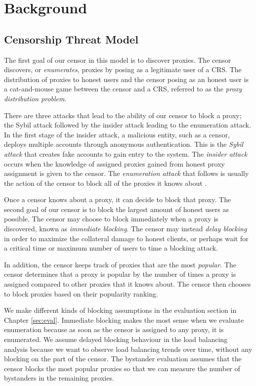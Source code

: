\chapter{Background}
\label{sec:background}
\newtheorem{theorem}{Theorem}

\section{Censorship Threat Model} 

The first goal of our censor in this model is to discover proxies. The censor discovers, or \textit{enumerates}, proxies by posing as a legitimate user of a \ac{CRS}. The distribution of proxies to honest users and the censor posing as an honest user is a cat-and-mouse game between the censor and a \ac{CRS}, referred to as the \textit{proxy distribution problem}. 

There are three attacks that lead to the ability of our censor to block a proxy; the Sybil attack followed by the insider attack leading to the enumeration attack. In the first stage of the insider attack, a malicious entity, such as a censor, deploys multiple accounts through anonymous authentication. This is the \textit{Sybil attack} that creates fake accounts to gain entry to the system. The \textit{insider attack} occurs when the knowledge of assigned proxies gained from honest proxy assignment is given to the censor. The \textit{enumeration attack} that follows is usually the action of the censor to block all of the proxies it knows about \cite{wang2013rbridge}.

Once a censor knows about a proxy, it can decide to block that proxy. The second goal of our censor is to block the largest amount of honest users as possible. The censor may choose to block immediately when a proxy is discovered, known as \textit{immediate blocking}. The censor may instead \textit{delay blocking} in order to maximize the collateral damage to honest clients, or perhaps wait for  a critical time or maximum number of users to time a blocking attack. 

In addition, the censor keeps track of proxies that are the most \textit{popular}. The censor determines that a proxy is popular by the number of times a proxy is assigned compared to other proxies that it knows about. The censor then chooses to block proxies based on their popularity ranking.

We make different kinds of blocking assumptions in the evaluation section in Chapter \ref{sec:eval}. Immediate blocking makes the most sense when we evaluate enumeration because as soon as the censor is assigned to any proxy, it is enumerated. We assume delayed blocking behaviour in the load balancing analysis because we want to observe load balancing trends over time, without any blocking on the part of the censor. The bystander evaluation assumes that the censor blocks the most popular proxies so that we can measure the number of bystanders in the remaining proxies.

